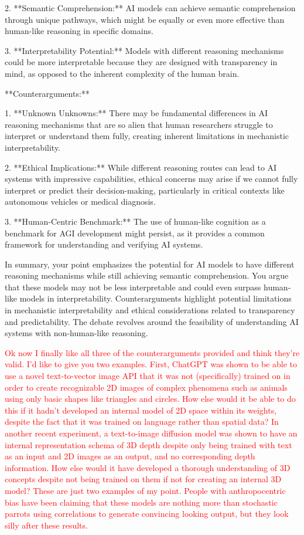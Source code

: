 \documentclass{article}
\begin{document}
2. **Semantic Comprehension:** AI models can achieve semantic comprehension through unique pathways, which might be equally or even more effective than human-like reasoning in specific domains.

3. **Interpretability Potential:** Models with different reasoning mechanisms could be more interpretable because they are designed with transparency in mind, as opposed to the inherent complexity of the human brain.

**Counterarguments:**

1. **Unknown Unknowns:** There may be fundamental differences in AI reasoning mechanisms that are so alien that human researchers struggle to interpret or understand them fully, creating inherent limitations in mechanistic interpretability.

2. **Ethical Implications:** While different reasoning routes can lead to AI systems with impressive capabilities, ethical concerns may arise if we cannot fully interpret or predict their decision-making, particularly in critical contexts like autonomous vehicles or medical diagnosis.

3. **Human-Centric Benchmark:** The use of human-like cognition as a benchmark for AGI development might persist, as it provides a common framework for understanding and verifying AI systems.

In summary, your point emphasizes the potential for AI models to have different reasoning mechanisms while still achieving semantic comprehension. You argue that these models may not be less interpretable and could even surpass human-like models in interpretability. Counterarguments highlight potential limitations in mechanistic interpretability and ethical considerations related to transparency and predictability. The debate revolves around the feasibility of understanding AI systems with non-human-like reasoning.

\textcolor{red}{Ok now I finally like all three of the counterarguments provided and think they're valid. I'd like to give you two examples. First, ChatGPT was shown to be able to use a novel text-to-vector image API that it was not (specifically) trained on in order to create recognizable 2D images of complex phenomena such as animals using only basic shapes like triangles and circles. How else would it be able to do this if it hadn't developed an internal model of 2D space within its weights, despite the fact that it was trained on language rather than spatial data? In another recent experiment, a text-to-image diffusion model was shown to have an internal representation schema of 3D depth despite only being trained with text as an input and 2D images as an output, and no corresponding depth information. How else would it have developed a thorough understanding of 3D concepts despite not being trained on them if not for creating an internal 3D model? These are just two examples of my point. People with anthropocentric bias have been claiming that these models are nothing more than stochastic parrots using correlations to generate convincing looking output, but they look silly after these results.}
\end{document}
